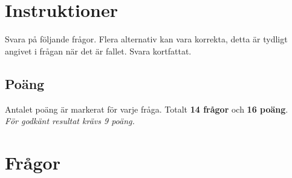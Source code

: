 \documentclass{exam}
\begin{document}
\section*{Instruktioner}
Svara på följande frågor. Flera alternativ kan vara korrekta, detta är tydligt angivet i frågan när det är fallet. Svara kortfattat.

\subsection*{Poäng}
Antalet poäng är markerat för varje fråga. Totalt \textbf{14 frågor} och \textbf{16 poäng}.\\ \textit{För godkänt resultat krävs 9 poäng.}

\section*{Frågor}
\end{document}
